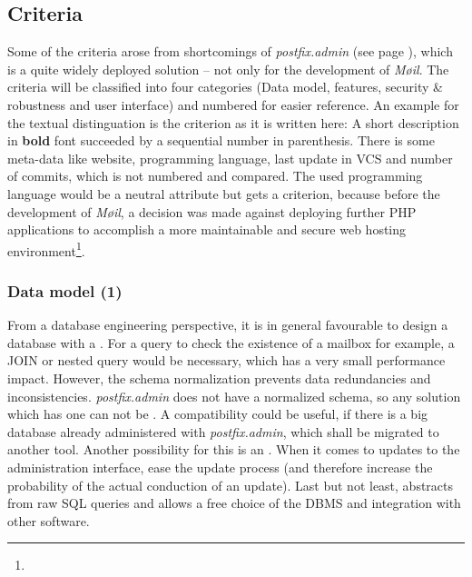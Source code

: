 \documentclass[12pt,a4paper]{scrartcl}
\begin{document}
		\subsection{Criteria}
		\label{sec:evaluation:criteria}
			Some of the criteria arose from shortcomings of
			\emph{postfix.admin} (see page
			\pageref{sec:contestants:postfix.admin}), which is a quite widely
			deployed solution -- not only for the development of \emph{Møil}.
			The criteria will be classified into four categories (Data model,
			features, security \& robustness and user interface) and numbered
			for easier reference. An example for the textual distinguation is
			the criterion  as it is
			written here: A short description in \textbf{bold} font succeeded
			by a sequential number in parenthesis. There is some meta-data like
			website, programming language, last update in VCS and number of
			commits, which is not numbered and compared. The used programming
			language would be a neutral attribute but gets a criterion, because
			before the development of \emph{Møil}, a decision was made against
			deploying further PHP applications to accomplish a more
			maintainable and secure web hosting
			environment\footnote{\urlPHPBashing}.

			\subsubsection{Data model (1)}
				From a database engineering perspective, it is in general
				favourable to design a data\-base with a  \cite{dbnorm}. For a query to
				check the existence of a mailbox for example, a JOIN or nested
				query would be necessary, which has a very small performance
				impact. However, the schema normalization prevents data
				redundancies and inconsistencies. \emph{postfix.admin} does not
				have a normalized schema, so any solution which has one can not
				be . A
				compatibility could be useful, if there is a big database
				already administered with \emph{postfix.admin}, which shall be
				migrated to another tool. Another possibility for this is an
				. When it comes
				to updates to the administration interface,  ease the update process
				(and therefore increase the probability of the actual
				conduction of an update). Last but not least,  abstracts from raw \ac{SQL} queries
				and allows a free choice of the \ac{DBMS} and integration with
				other software.
\end{document}
